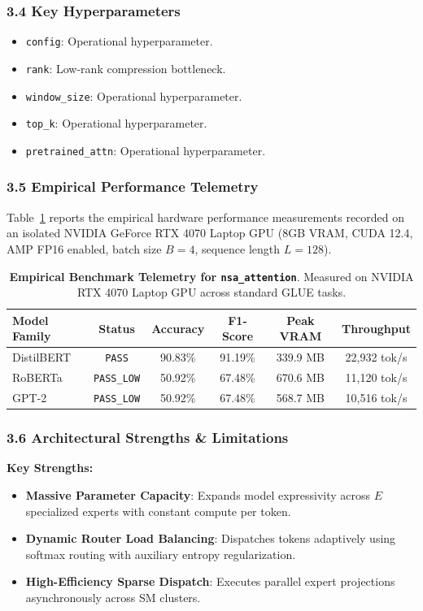 \subsubsection*{3.4 Key Hyperparameters}
\begin{itemize}
    \item \texttt{config}: Operational hyperparameter.
    \item \texttt{rank}: Low-rank compression bottleneck.
    \item \texttt{window\_size}: Operational hyperparameter.
    \item \texttt{top\_k}: Operational hyperparameter.
    \item \texttt{pretrained\_attn}: Operational hyperparameter.
\end{itemize}

\subsubsection*{3.5 Empirical Performance Telemetry}
Table~\ref{tab:telemetry_nsa_attention} reports the empirical hardware performance measurements recorded on an isolated NVIDIA GeForce RTX 4070 Laptop GPU (8GB VRAM, CUDA 12.4, AMP FP16 enabled, batch size $B=4$, sequence length $L=128$).

\begin{table}[h]
\centering
\small
\caption{\textbf{Empirical Benchmark Telemetry for \texttt{nsa\_attention}}. Measured on NVIDIA RTX 4070 Laptop GPU across standard GLUE tasks.}
\label{tab:telemetry_nsa_attention}
\begin{tabular*}{\columnwidth}{@{\extracolsep{\fill}}lccccc}
\toprule
\textbf{Model Family} & \textbf{Status} & \textbf{Accuracy} & \textbf{F1-Score} & \textbf{Peak VRAM} & \textbf{Throughput} \\
\midrule
DistilBERT & \texttt{PASS} & 90.83\% & 91.19\% & 339.9 MB & 22,932 tok/s \\
RoBERTa & \texttt{PASS\_LOW} & 50.92\% & 67.48\% & 670.6 MB & 11,120 tok/s \\
GPT-2 & \texttt{PASS\_LOW} & 50.92\% & 67.48\% & 568.7 MB & 10,516 tok/s \\
\bottomrule
\end{tabular*}
\end{table}

\subsubsection*{3.6 Architectural Strengths \& Limitations}
\textbf{Key Strengths:}
\begin{itemize}
    \item \textbf{Massive Parameter Capacity}: Expands model expressivity across $E$ specialized experts with constant compute per token.
    \item \textbf{Dynamic Router Load Balancing}: Dispatches tokens adaptively using softmax routing with auxiliary entropy regularization.
    \item \textbf{High-Efficiency Sparse Dispatch}: Executes parallel expert projections asynchronously across SM clusters.
\end{itemize}

